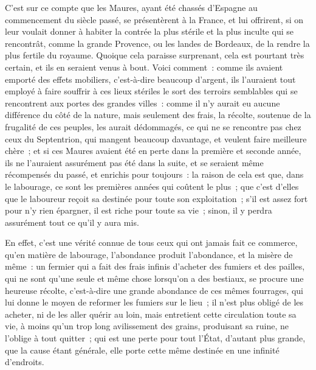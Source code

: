 \documentclass[french,twoside]{book} %
\begin{document}
C’est sur ce compte que les Maures, ayant été chassés d’Espagne au commencement du siècle passé, se présentèrent à la France, et lui offrirent, si on leur voulait donner à habiter la contrée la plus stérile et la plus inculte qui se rencontrât, comme la grande Provence, ou les landes de Bordeaux, de la rendre la plus fertile du royaume. Quoique cela paraisse surprenant, cela est pourtant très certain, et ils en seraient venus à bout. Voici comment : comme ils avaient emporté des effets mobiliers, c’est-à-dire beaucoup d’argent, ils l’auraient tout employé à faire souffrir à ces lieux stériles le sort des terroirs semblables qui se rencontrent aux portes des grandes villes : comme il n’y aurait eu aucune différence du côté de la nature, mais seulement des frais, la récolte, soutenue de la frugalité de ces peuples, les aurait dédommagés, ce qui ne se rencontre pas chez ceux du Septentrion, qui mangent beaucoup davantage, et veulent faire meilleure chère ; et si ces Maures avaient été en perte dans la première et seconde année, ils ne l’auraient assurément pas été dans la suite, et se seraient même récompensés du passé, et enrichis pour toujours : la raison de cela est que, dans le labourage, ce sont les premières années qui coûtent le plus ; que c’est d’elles que le laboureur reçoit sa destinée pour toute son exploitation ; s’il est assez fort pour n’y rien épargner, il est riche pour toute sa vie ; sinon, il y perdra assurément tout ce qu’il y aura mis.\par
En effet, c’est une vérité connue de tous ceux qui ont jamais fait ce commerce, qu’en matière de labourage, l’abondance produit l’abondance, et la misère de même : un fermier qui a fait des frais infinis d’acheter des fumiers et des pailles, qui ne sont qu’une seule et même chose lorsqu’on a des bestiaux, se procure une heureuse récolte, c’est-à-dire une grande abondance de ces mêmes fourrages, qui lui donne le moyen de reformer les fumiers sur le lieu ; il n’est plus obligé de les acheter, ni de les aller quérir au loin, mais entretient cette circulation toute sa vie, à moins qu’un trop long avilissement des grains, produisant sa ruine, ne l’oblige à tout quitter ; qui est une perte pour tout l’État, d’autant plus grande, que la cause étant générale, elle porte cette même destinée en une infinité d’endroits.\par
\end{document}
